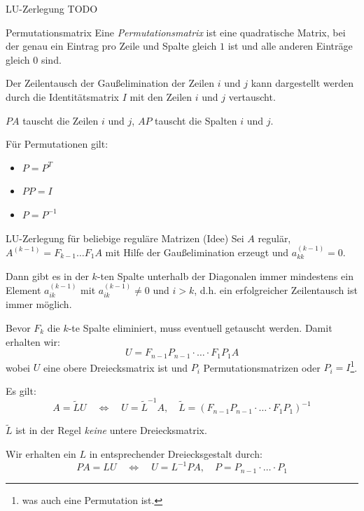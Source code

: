 \begin{example}{LU-Zerlegung}
    TODO
\end{example}

\begin{defi}{Permutationsmatrix}
    Eine \emph{Permutationsmatrix} ist eine quadratische Matrix, bei der genau ein Eintrag pro Zeile und Spalte gleich $1$ ist und alle anderen Einträge gleich $0$ sind.

    Der Zeilentausch der Gaußelimination der Zeilen $i$ und $j$ kann dargestellt werden durch die Identitätsmatrix $I$ mit den Zeilen $i$ und $j$ vertauscht.

    $PA$ tauscht die Zeilen $i$ und $j$, $AP$ tauscht die Spalten $i$ und $j$.

    Für Permutationen gilt:
    \begin{itemize}
        \item $P = P^T$
        \item $PP = I$
        \item $P = P^{-1}$
    \end{itemize}
\end{defi}

\begin{bonus}{LU-Zerlegung für beliebige reguläre Matrizen (Idee)}
    Sei $A$ regulär, $A^{(k-1)} = F_{k-1} \ldots F_1 A$ mit Hilfe der Gaußelimination erzeugt und $a^{(k-1)}_{kk} = 0$.

    Dann gibt es in der $k$-ten Spalte unterhalb der Diagonalen immer mindestens ein Element $a^{(k-1)}_{ik}$ mit $a^{(k-1)}_{ik} \neq 0$ und $i > k$, d.h. ein erfolgreicher Zeilentausch ist immer möglich.

    Bevor $F_k$ die $k$-te Spalte eliminiert, muss eventuell getauscht werden.
    Damit erhalten wir:
    \[
        U = F_{n-1} P_{n-1} \cdot \ldots \cdot F_1 P_1 A
    \]
    wobei $U$ eine obere Dreiecksmatrix ist und $P_i$ Permutationsmatrizen oder $P_i = I$\footnote{was auch eine Permutation ist.}.

    Es gilt:
    \[
        A = \tilde{L} U \quad \iff \quad U = \tilde{L}^{-1} A, \quad \tilde{L} = (F_{n-1} P_{n-1} \cdot \ldots \cdot F_1 P_1)^{-1}
    \]

    $\tilde{L}$ ist in der Regel \emph{keine} untere Dreiecksmatrix.

    Wir erhalten ein $L$ in entsprechender Dreiecksgestalt durch:
    \[
        PA = LU \quad \iff \quad U = L^{-1} PA, \quad P = P_{n-1} \cdot \ldots \cdot P_1
    \]
\end{bonus}

